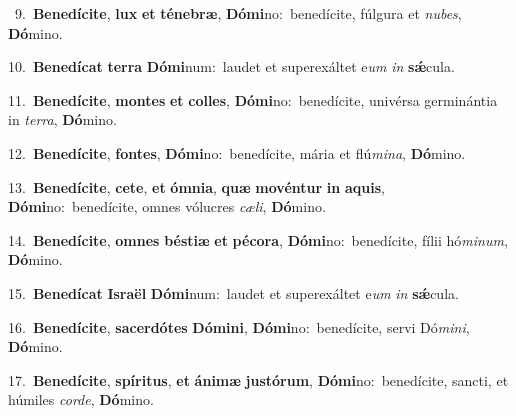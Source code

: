{{\numbfont\textcolor{\numbcolor}{~9.}}~\-\textbf{Be}\-\textbf{ne}\textbf{dí}\textbf{ci}\textbf{te}, \textbf{lux} \textbf{et} \textbf{té}\-\textbf{ne}\textbf{bræ}, \textbf{Dó}\-\textbf{mi}no:~\star benedícite, fúlgura et \textit{nu}\-\textit{bes}, \textbf{Dó}\-mino.\par
{\numbfont\textcolor{\numbcolor}{10.}}~\-\textbf{Be}\-\textbf{ne}\textbf{dí}\textbf{cat} \textbf{ter}\-\textbf{ra} \textbf{Dó}\-\textbf{mi}num:~\star laudet et superexáltet e\textit{um} \textit{in} \textbf{sǽ}\-cula.\par
{\numbfont\textcolor{\numbcolor}{11.}}~\-\textbf{Be}\-\textbf{ne}\textbf{dí}\textbf{ci}\textbf{te}, \textbf{mon}\-\textbf{tes} \textbf{et} \textbf{col}\-\textbf{les}, \textbf{Dó}\-\textbf{mi}no:~\star benedícite, univérsa germinántia in \textit{ter}\-\textit{ra}, \textbf{Dó}\-mino.\par
{\numbfont\textcolor{\numbcolor}{12.}}~\-\textbf{Be}\-\textbf{ne}\textbf{dí}\textbf{ci}\textbf{te}, \textbf{fon}\-\textbf{tes}, \textbf{Dó}\-\textbf{mi}no:~\star benedícite, mária et flú\-\textit{mi}\-\textit{na}, \textbf{Dó}\-mino.\par
{\numbfont\textcolor{\numbcolor}{13.}}~\-\textbf{Be}\-\textbf{ne}\textbf{dí}\textbf{ci}\textbf{te}, \textbf{ce}\-\textbf{te}, \textbf{et} \textbf{óm}\-\textbf{ni}\textbf{a}, \textbf{quæ} \textbf{mo}\-\textbf{vén}\textbf{tur} \textbf{in} \textbf{a}\-\textbf{quis}, \textbf{Dó}\-\textbf{mi}no:~\star benedícite, omnes vólucres \textit{cæ}\-\textit{li}, \textbf{Dó}\-mino.\par
{\numbfont\textcolor{\numbcolor}{14.}}~\-\textbf{Be}\-\textbf{ne}\textbf{dí}\textbf{ci}\textbf{te}, \textbf{om}\-\textbf{nes} \textbf{bés}\-\textbf{ti}\textbf{æ} \textbf{et} \textbf{pé}\-\textbf{co}\textbf{ra}, \textbf{Dó}\-\textbf{mi}no:~\star benedícite, fílii hó\-\textit{mi}\-\textit{num}, \textbf{Dó}\-mino.\par
{\numbfont\textcolor{\numbcolor}{15.}}~\-\textbf{Be}\-\textbf{ne}\textbf{dí}\textbf{cat} \textbf{Is}\-\textbf{ra}\textbf{ël} \textbf{Dó}\-\textbf{mi}num:~\star laudet et superexáltet e\textit{um} \textit{in} \textbf{sǽ}\-cula.\par
{\numbfont\textcolor{\numbcolor}{16.}}~\-\textbf{Be}\-\textbf{ne}\textbf{dí}\textbf{ci}\textbf{te}, \textbf{sa}\-\textbf{cer}\textbf{dó}\textbf{tes} \textbf{Dó}\-\textbf{mi}\textbf{ni}, \textbf{Dó}\-\textbf{mi}no:~\star benedícite, servi Dó\-\textit{mi}\-\textit{ni}, \textbf{Dó}\-mino.\par
{\numbfont\textcolor{\numbcolor}{17.}}~\-\textbf{Be}\-\textbf{ne}\textbf{dí}\textbf{ci}\textbf{te}, \textbf{spí}\-\textbf{ri}\textbf{tus}, \textbf{et} \textbf{á}\-\textbf{ni}\textbf{mæ} \textbf{jus}\-\textbf{tó}\textbf{rum}, \textbf{Dó}\-\textbf{mi}no:~\star benedícite, sancti, et húmiles \textit{cor}\-\textit{de}, \textbf{Dó}\-mino.\par
}
